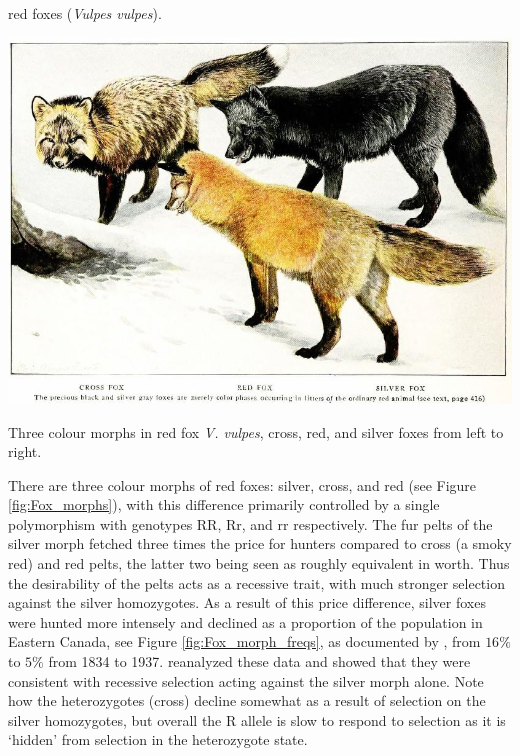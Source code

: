 red foxes ({\it Vulpes vulpes}). \begin{marginfigure}\begin{center}
  \includegraphics[width = \textwidth]{illustration_images/single_locus_selection/fox_morphs/fox_morphs_silver_cross.png}
\end{center}
\caption{Three colour morphs in red fox {\it V. vulpes}, cross, red,
  and silver foxes from left to right. } \label{fig:Fox_morphs}
\end{marginfigure}  There are three colour morphs of red foxes: silver, cross, and
red (see Figure \ref{fig:Fox_morphs}), with this difference primarily
controlled by a single polymorphism with genotypes RR, Rr, and rr respectively. The fur pelts of the silver morph
fetched three times the price for hunters compared to cross (a smoky red) and red
pelts, the latter two being seen as roughly equivalent in worth. Thus
the desirability of the pelts acts as a recessive trait, with much
stronger selection against the silver homozygotes.  As a
result of this price difference, silver foxes were hunted more
intensely and declined as a proportion of the population in Eastern Canada, see Figure
\ref{fig:Fox_morph_freqs}, as documented by \citeauthor{elton:42},
from $16\%$ to $5\%$ from 1834 to 1937.
\citet{haldane:42} reanalyzed these data and showed that they
were consistent with recessive selection acting against the silver
morph alone. 
Note how the heterozygotes (cross) decline somewhat as a
result of selection on the silver homozygotes, but overall the R
allele is slow to respond to selection as it is `hidden' from
selection in the heterozygote state.

